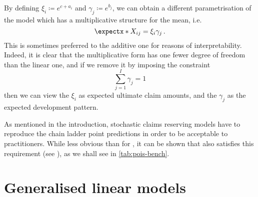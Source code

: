 \documentclass[a4paper]{book}
\begin{document}
By defining $\xi_i \coloneqq e^{c + a_i}$ and $\gamma_j \coloneqq e^{b_j}$, we can obtain a different parametrisation of the model which has a multiplicative structure for the mean, i.e.
\begin{equation}
  \expect{X_{ij}} = \xi_i \gamma_j \,.
\end{equation}
This is sometimes preferred to the additive one for reasons of interpretability. Indeed, it is clear that the multiplicative form has one fewer degree of freedom than the linear one, and if we remove it by imposing the constraint
\begin{equation}
  \sum_{j = 1}^I \gamma_j = 1
\end{equation}
then we can view the $\xi_i$ as expected ultimate claim amounts, and the $\gamma_j$ as the expected development pattern.

As mentioned in the introduction, stochastic claims reserving models have to reproduce the chain ladder point predictions in order to be acceptable to practitioners. While less obvious than for , it can be shown that  also satisfies this requirement (see \cite[Lemma 2.16]{wuthrich:stochastic-reserving}), as we shall see in \cref{tab:pois-bench}.

\section{Generalised linear models} \label{sec:glm}
\end{document}
